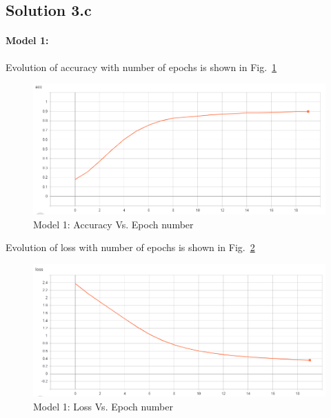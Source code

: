 \subsection*{Solution 3.c}
\paragraph{Model 1:}Evolution of accuracy with number of epochs is shown in Fig.~\ref{fig:acc_3c_1}
\begin{figure}[h!]
	\centering
	\includegraphics[scale=0.5]{acc_model_1.png}
	\caption{Model 1: Accuracy Vs. Epoch number}
	\label{fig:acc_3c_1}
\end{figure}
 Evolution of loss with number of epochs is shown in Fig.~\ref{fig:loss_3c_1}
\begin{figure}[h!]
	\centering
	\includegraphics[scale=0.5]{loss_model_1.png}
	\caption{Model 1: Loss Vs. Epoch number}
	\label{fig:loss_3c_1}
\end{figure}
